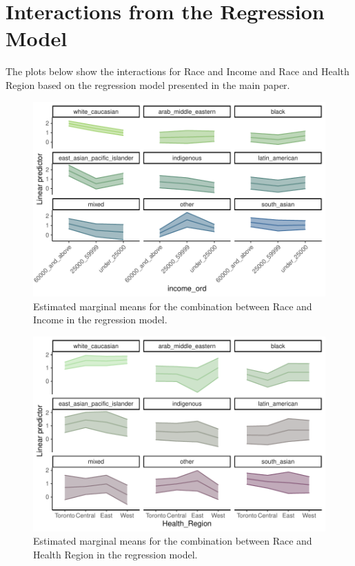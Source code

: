 \documentclass[
  letterpaper,
  DIV=11,
  numbers=noendperiod]{scrartcl}
\begin{document}
\hypertarget{interactions-from-the-regression-model}{%
\section{Interactions from the Regression
Model}\label{interactions-from-the-regression-model}}

The plots below show the interactions for Race and Income and Race and
Health Region based on the regression model presented in the main paper.

\begin{figure}

{\centering \includegraphics{appendix_files/figure-pdf/interaction-race-income-1.pdf}

}

\caption{Estimated marginal means for the combination between Race and
Income in the regression model.}

\end{figure}

\begin{figure}

{\centering \includegraphics{appendix_files/figure-pdf/interaction-race-hr-1.pdf}

}

\caption{Estimated marginal means for the combination between Race and
Health Region in the regression model.}

\end{figure}
\end{document}
